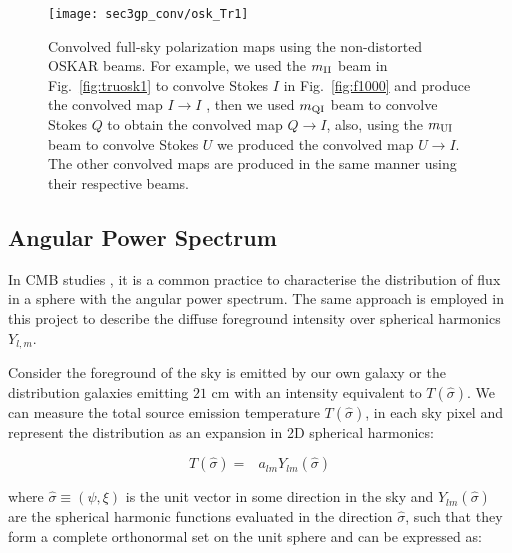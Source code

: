 \begin{figure}
\centering
\begin{minipage}[H]{\linewidth}
       \texttt{[image: sec3gp\_conv/osk\_Tr1]}
      \end{minipage}
    \caption{Convolved full-sky polarization maps using the non-distorted OSKAR beams. 
    For example, we used the $m_{\rm II}$ beam in Fig.~\ref{fig:truosk1} to convolve Stokes $I$ in Fig.~\ref{fig:f1000} and produce the convolved map $I \rightarrow I$ , 
    then we used $m_{\rm QI}$ beam to convolve Stokes $Q$ to obtain the convolved map $Q \rightarrow I$, also, using the $m_{\rm UI}$ beam to convolve Stokes $U$ we produced the convolved map $U \rightarrow I$. The other convolved maps are produced in the same manner using their respective beams.} \label{fig:fgTrCnv}
\end{figure}
\FloatBarrier


% 
\subsection{Angular Power Spectrum}    \label{sec:spectrum}
In CMB studies \citep{2016MNRAS.457.1796A,2016A&A...588A..65K,2015aska.confE..35W,2006NewAR..50..854S,2006ApJ...645L..89S,1998PhRvD..57.5273W},
it is a common practice to characterise the distribution of flux in a sphere with the angular power spectrum. The same approach is employed in
this project to describe the diffuse foreground intensity over spherical harmonics $Y_{l,m}$.

Consider the foreground of the sky is emitted by our own galaxy or the distribution galaxies emitting $21$ cm with an intensity equivalent to $ T(\hat{\sigma})$. We can measure the total source emission temperature $T(\hat{\sigma})$, in each sky pixel and represent the distribution as an expansion in 2D spherical harmonics:

 \begin{equation}  	\label{eq:q14} 
                    T(\hat{\sigma}) = \mathop{\sum_{l\, = 0}^{\infty}\sum_{m\, = -l}^{l}} \, a_{lm}Y_{lm}(\hat{\sigma})
     \end{equation}

\noindent where $\hat{\sigma} \equiv (\psi, \xi)$ is the unit vector in some direction in the sky and $Y_{lm}(\hat{\sigma})$ are 
the spherical harmonic functions evaluated in the direction $\hat{\sigma}$, such that they form a complete orthonormal set 
on the unit sphere and can be expressed as:


